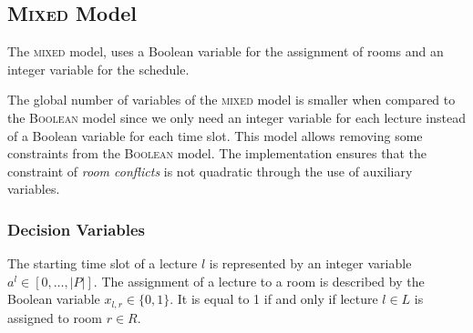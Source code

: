\subsection{\textsc{Mixed} Model}

The \textsc{mixed} model, uses a Boolean variable for the assignment of rooms and an integer variable for the schedule.

The global number of variables of the \textsc{mixed} model is smaller when compared to the \textsc{Boolean} model since we only need an integer variable for each lecture instead of a Boolean variable for each time slot. This model allows removing some constraints from the \textsc{Boolean} model. The implementation ensures that the constraint of {\em room conflicts} is not quadratic through the use of auxiliary variables.


\vspace{-.5cm}


\subsubsection{Decision Variables}

The starting time slot of a lecture $l$ is represented by an integer variable $a^l \in [0, \ldots, |P|]$. The assignment of a lecture to a room is described by the Boolean variable $x_{l,r} \in \{0, 1\}$. It is equal to 1 if and only if lecture $l \in L$ is assigned to room $r \in R$. 

\vspace{-.5cm}


